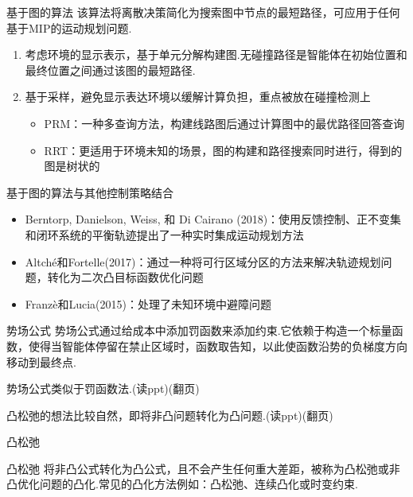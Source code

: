 \documentclass[notheorems,11pt]{beamer}
\theoremstyle{plain}
\numberwithin{theorem}{section}
\numberwithin{lemma}{section}
\numberwithin{corollary}{section}
\theoremstyle{example}
\begin{document}
\begin{frame}{基于图的算法}
  该算法将离散决策简化为搜索图中节点的最短路径，可应用于任何基于MIP的运动规划问题.
  \begin{enumerate}
    \item 考虑环境的显示表示，基于单元分解构建图.无碰撞路径是智能体在初始位置和最终位置之间通过该图的最短路径.
    \item 基于采样，避免显示表达环境以缓解计算负担，重点被放在碰撞检测上
    \begin{itemize}
      \item PRM：一种多查询方法，构建线路图后通过计算图中的最优路径回答查询
      \item RRT：更适用于环境未知的场景，图的构建和路径搜索同时进行，得到的图是树状的
    \end{itemize}
  \end{enumerate}
\end{frame}

\begin{frame}{基于图的算法与其他控制策略结合}
  \begin{itemize}
    \item Berntorp, Danielson, Weiss, 和 Di Cairano (2018)：使用反馈控制、正不变集和闭环系统的平衡轨迹提出了一种实时集成运动规划方法
    \item Altché和Fortelle(2017)：通过一种将可行区域分区的方法来解决轨迹规划问题，转化为二次凸目标函数优化问题
    \item Franzè和Lucia(2015)：处理了未知环境中避障问题
  \end{itemize}
\end{frame}

\begin{frame}{势场公式}
  势场公式通过给成本中添加罚函数来添加约束.它依赖于构造一个标量函数，使得当智能体停留在禁止区域时，函数取告知，以此使函数沿势的负梯度方向移动到最终点.
\end{frame}

\begin{frame}
  势场公式类似于罚函数法.(读ppt)(翻页) \par \vspace{1 em}
  凸松弛的想法比较自然，即将非凸问题转化为凸问题.(读ppt)(翻页) \par \vspace{1 em}

\end{frame}

\begin{frame}{凸松弛}
  \begin{block}{凸松弛}
    将非凸公式转化为凸公式，且不会产生任何重大差距，被称为凸松弛或非凸优化问题的凸化.常见的凸化方法例如：凸松弛、连续凸化或时变约束.
  \end{block}
\end{frame}
\end{document}
